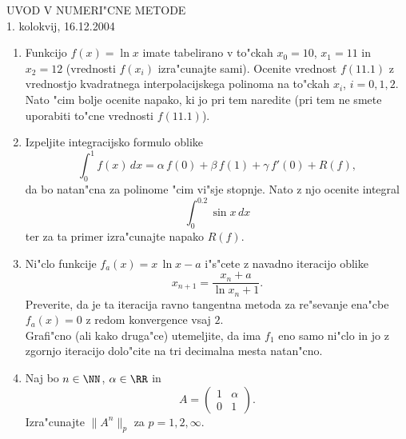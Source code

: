 

\begin{center}
  {\large UVOD V NUMERI"CNE METODE\\
    1. kolokvij, 16.12.2004\\
    }
\end{center}
\vspace{2cm}

\begin{enumerate}

  \item Funkcijo $f(x)=\ln{x}$ imate tabelirano v 
    to"ckah $x_0=10$, $x_1=11$ in $x_2=12$ (vrednosti 
    $f(x_i)$ izra"cunajte sami). Ocenite vrednost $f(11.1)$
    z vrednostjo kvadratnega interpolacijskega polinoma 
    na to"ckah $x_i$, $i=0,1,2$. Nato "cim bolje ocenite napako, ki jo
    pri tem naredite (pri tem ne smete uporabiti to"cne
    vrednosti $f(11.1)$).
    
  \item Izpeljite integracijsko formulo oblike
    $$\int_{0}^1 f(x)\,dx=\alpha\,f(0)+\beta\,f(1)+\gamma\,f'(0)+R(f),$$
    da bo natan"cna za polinome "cim vi"sje stopnje. Nato 
    z njo ocenite integral
    $$\int_{0}^{0.2}\sin{x}\,dx$$
    ter za ta primer izra"cunajte napako $R(f)$.
   
  \item Ni"clo funkcije $f_a(x)=x\,\ln{x}-a$ i"s"cete z navadno iteracijo
   oblike
   $$x_{n+1}=\frac{x_{n}+a}{\ln{x_n}+1}.$$
   Preverite, da je ta iteracija ravno tangentna metoda  za re"sevanje
   ena"cbe $f_a(x)=0$ z redom konvergence vsaj $2$.\\
   Grafi"cno (ali kako druga"ce) utemeljite, da ima $f_1$ eno samo
   ni"clo in jo z zgornjo iteracijo dolo"cite na tri decimalna mesta 
   natan"cno.
  
  \item Naj bo $n\in\NN$, $\alpha\in\RR$ in 
    $$A=\left(
      \begin{array}{cc}
        1 & \alpha \\
        0 & 1
      \end{array}\right).
    $$
    Izra"cunajte $\|A^n\|_p$ za $p=1,2,\infty$.


\end{enumerate}
